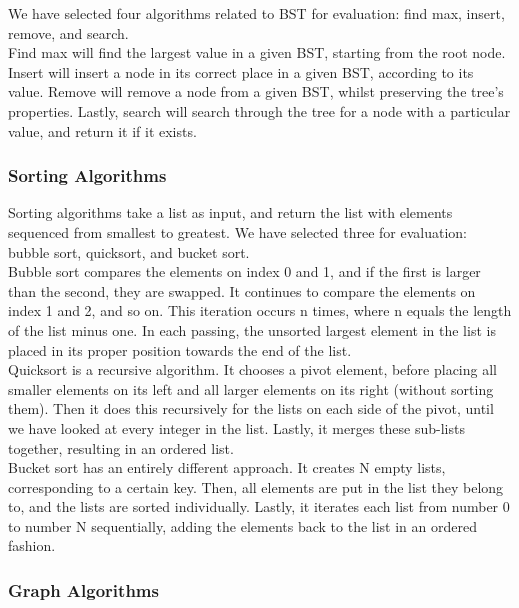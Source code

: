 We have selected four algorithms related to BST for evaluation: find max, insert, remove, and search. \\

Find max will find the largest value in a given BST, starting from the root node. Insert will insert a node in its correct place in a given BST, according to its value. Remove will remove a node from a given BST, whilst preserving the tree's properties. Lastly, search will search through the tree for a node with a particular value, and return it if it exists.

\subsubsection{Sorting Algorithms}

Sorting algorithms take a list as input, and return the list with elements sequenced from smallest to greatest. We have selected three for evaluation: bubble sort, quicksort, and bucket sort. \\

Bubble sort compares the elements on index 0 and 1, and if the first is larger than the second, they are swapped. It continues to compare the elements on index 1 and 2, and so on. This iteration occurs n times, where n equals the length of the list minus one. In each passing, the unsorted largest element in the list is placed in its proper position towards the end of the list. \\

Quicksort is a recursive algorithm. It chooses a pivot element, before placing all smaller elements on its left and all larger elements on its right (without sorting them). Then it does this recursively for the lists on each side of the pivot, until we have looked at every integer in the list. Lastly, it merges these sub-lists together, resulting in an ordered list. \\

Bucket sort has an entirely different approach. It creates N empty lists, corresponding to a certain key. Then, all elements are put in the list they belong to, and the lists are sorted individually. Lastly, it iterates each list from number 0 to number N sequentially, adding the elements back to the list in an ordered fashion.

\subsubsection{Graph Algorithms}

